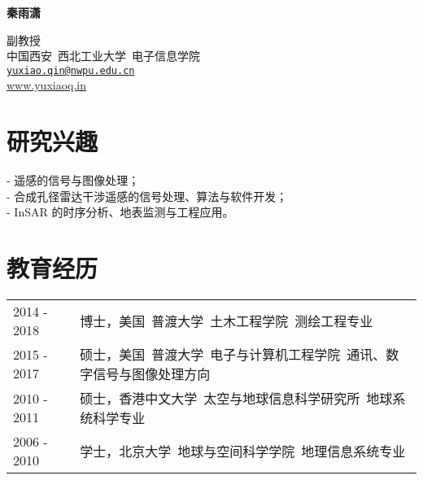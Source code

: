 \documentclass[letterpaper]{article}
\def\name{\textbf{秦雨潇}}
\begin{document}
{\huge \name}


\vspace{0.2in}

\begin{minipage}{0.8\linewidth}
	副教授 \\
	中国西安\ 西北工业大学\ 电子信息学院\\
  \href{mailto:yuxiao.qin@nwpu.edu.cn}{\tt yuxiao.qin@nwpu.edu.cn} \\ 
  \href{www.yuxiaoq.in}{www.yuxiaoq.in}
\end{minipage}


\section*{\textsc{研究兴趣}}
- 遥感的信号与图像处理；\vspace{.5em}\\
- 合成孔径雷达干涉遥感的信号处理、算法与软件开发；\vspace{.5em}\\
- InSAR 的时序分析、地表监测与工程应用。


\section*{\textsc{教育经历}}
\begin{tabular}{ll}
2014 - 2018 & 博士，美国\ 普渡大学\ 土木工程学院\ 测绘工程专业\vspace{.5em}\\
2015 - 2017 & 硕士，美国\ 普渡大学\ 电子与计算机工程学院\ 通讯、数字信号与图像处理方向\vspace{.5em}\\
2010 - 2011 & 硕士，香港中文大学\ 太空与地球信息科学研究所\  地球系统科学专业 \vspace{.5em}\\
2006 - 2010 & 学士，北京大学\ 地球与空间科学学院\ 地理信息系统专业
\end{tabular}
\end{document}
